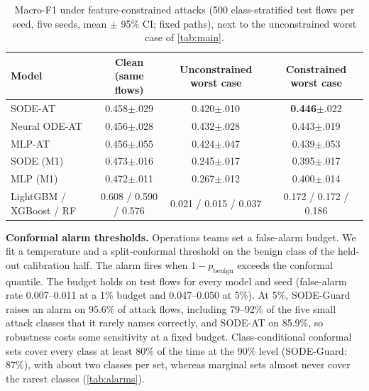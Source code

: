 \documentclass{article}
\theoremstyle{definition}
\newcommand{\ci}[1]{{\scriptsize$\pm$#1}}
\begin{document}
\begin{table}[t]
\caption{Macro-F1 under feature-constrained attacks (500 class-stratified test
flows per seed, five seeds, mean $\pm$ 95\% CI; fixed paths), next to the
unconstrained worst case of \cref{tab:main}.}
\label{tab:constrained}
\centering\footnotesize
\setlength{\tabcolsep}{4pt}
\begin{tabular}{lccc}
\toprule
Model & Clean (same flows) & Unconstrained worst case & Constrained worst case\\
\midrule
SODE-AT & 0.458\ci{.029} & 0.420\ci{.010} & \textbf{0.446}\ci{.022}\\
Neural ODE-AT & 0.456\ci{.028} & 0.432\ci{.028} & 0.443\ci{.019}\\
MLP-AT & 0.456\ci{.055} & 0.424\ci{.047} & 0.439\ci{.053}\\
SODE (M1) & 0.473\ci{.016} & 0.245\ci{.017} & 0.395\ci{.017}\\
MLP (M1) & 0.472\ci{.011} & 0.267\ci{.012} & 0.400\ci{.014}\\
LightGBM / XGBoost / RF & 0.608 / 0.590 / 0.576 & 0.021 / 0.015 / 0.037 & 0.172 / 0.172 / 0.186\\
\bottomrule
\end{tabular}
\end{table}

\textbf{Conformal alarm thresholds.} Operations teams set a false-alarm budget.
We fit a temperature \citep{guo2017calibration} and a split-conformal threshold
on the benign class of the held-out calibration half. The alarm fires when
$1-p_{\mathrm{benign}}$ exceeds the conformal quantile. The budget holds on
test flows for every model and seed (false-alarm rate 0.007--0.011 at a 1\%
budget and 0.047--0.050 at 5\%). At 5\%, SODE-Guard raises an alarm on 95.6\% of
attack flows, including 79--92\% of the five small attack classes that it
rarely names correctly, and SODE-AT on 85.9\%, so robustness costs some
sensitivity at a fixed budget. Class-conditional conformal sets
\citep{sadinle2019lac} cover every class at least 80\% of the time at the 90\%
level (SODE-Guard: 87\%), with about two classes per set, whereas marginal sets
almost never cover the rarest classes (\cref{tab:alarms}).
\end{document}
